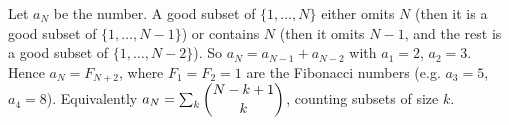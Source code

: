 Let $a_N$ be the number. A good subset of $\{1,\dots,N\}$ either omits $N$ (then it is a good subset of $\{1,\dots,N-1\}$) or contains $N$ (then it omits $N-1$, and the rest is a good subset of $\{1,\dots,N-2\}$). So $a_N=a_{N-1}+a_{N-2}$ with $a_1=2$, $a_2=3$. Hence $a_N=\boxed{F_{N+2}}$, where $F_1=F_2=1$ are the Fibonacci numbers (e.g. $a_3=5$, $a_4=8$). Equivalently $a_N=\sum_k\dbinom{N-k+1}{k}$, counting subsets of size $k$.
